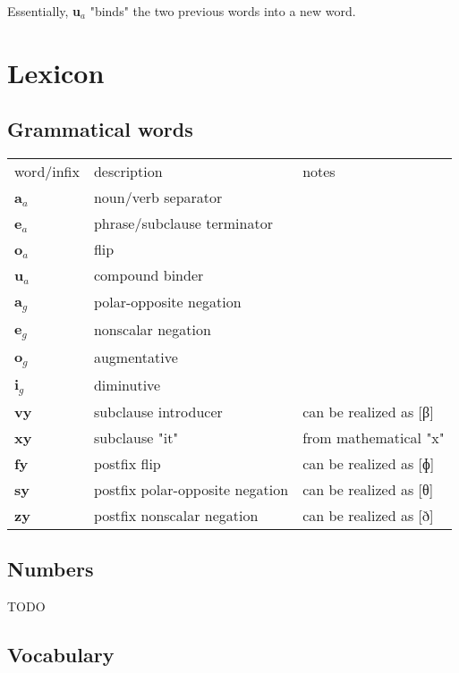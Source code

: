 \documentclass{article}
\begin{document}
\noindent Essentially, \textbf{u$_a$} "binds" the two previous words into a new
word.

\section{Lexicon}

\subsection{Grammatical words}

\begin{tabularx}{\textwidth}{lXX}
    word/infix & description & notes \\[0.5em]

    \textbf{a$_a$} & noun/verb separator & \\
    \textbf{e$_a$} & phrase/subclause terminator & \\
    \textbf{o$_a$} & flip & \\
    \textbf{u$_a$} & compound binder & \\[0.5em]

    \textbf{a$_g$} & polar-opposite negation & \\
    \textbf{e$_g$} & nonscalar negation & \\
    \textbf{o$_g$} & augmentative & \\
    \textbf{i$_g$} & diminutive & \\[0.5em]

    \textbf{vy} & subclause introducer & can be realized as [β] \\
    \textbf{xy} & subclause "it" & from mathematical "x" \\
    \textbf{fy} & postfix flip & can be realized as [ɸ] \\
    \textbf{sy} & postfix polar-opposite negation & can be realized as [θ] \\
    \textbf{zy} & postfix nonscalar negation & can be realized as [ð] \\
\end{tabularx}

\subsection{Numbers}

TODO

\subsection{Vocabulary}
\end{document}
